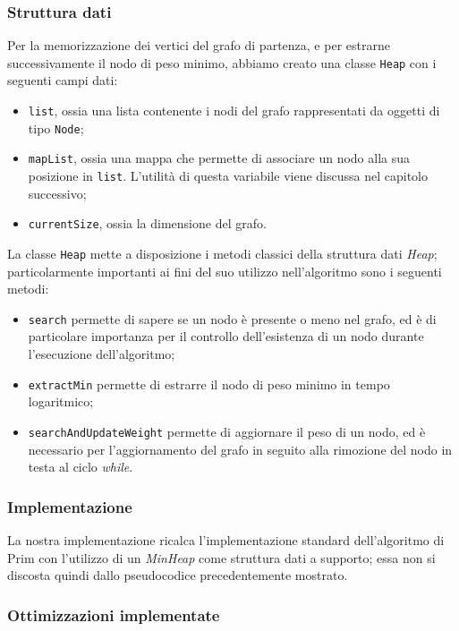 \subsubsection{Struttura dati}

Per la memorizzazione dei vertici del grafo di partenza, e per estrarne successivamente il nodo di peso minimo, abbiamo creato una classe \texttt{Heap} con i seguenti campi dati:
\begin{itemize}
    \item \texttt{list}, ossia una lista contenente i nodi del grafo rappresentati da oggetti di tipo \texttt{Node};
    \item \texttt{mapList}, ossia una mappa che permette di associare un nodo alla sua posizione in \texttt{list}. L'utilità di questa variabile viene discussa nel capitolo successivo;
    \item \texttt{currentSize}, ossia la dimensione del grafo.
\end{itemize}
La classe \texttt{Heap} mette a disposizione i metodi classici della struttura dati \textit{Heap}; particolarmente importanti ai fini del suo utilizzo nell'algoritmo sono i seguenti metodi:
\begin{itemize}
    \item \texttt{search} permette di sapere se un nodo è presente o meno nel grafo, ed è di particolare importanza per il controllo dell'esistenza di un nodo durante l'esecuzione dell'algoritmo;
    \item \texttt{extractMin} permette di estrarre il nodo di peso minimo in tempo logaritmico;
    \item \texttt{searchAndUpdateWeight} permette di aggiornare il peso di un nodo, ed è necessario
    per l'aggiornamento del grafo in seguito alla rimozione del nodo in testa al ciclo \textit{while}.
\end{itemize}

\subsubsection{Implementazione}
La nostra implementazione ricalca l'implementazione standard dell'algoritmo di Prim con l'utilizzo di un 
\textit{MinHeap} come struttura dati a supporto; essa non si discosta quindi dallo pseudocodice precedentemente mostrato.


\subsubsection{Ottimizzazioni implementate}

